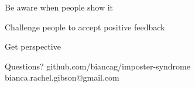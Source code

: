\documentclass[aspectratio=169]{beamer}
\begin{document}
\begin{frame}
  \begin{center}
    \Huge Be aware when people show it
    \small
  \end{center}
\end{frame}

\begin{frame}
  \begin{center}
    \Huge Challenge people to accept positive feedback
  \end{center}
\end{frame}

\begin{frame}
  \begin{center}
    \Huge Get perspective
    \small
  \end{center}
\end{frame}

\begin{frame}
  \begin{center}
    \Huge Questions?
    github.com/biancag/imposter-syndrome
    bianca.rachel.gibson@gmail.com
  \end{center}
\end{frame}

\begin{frame}
  

  
\end{frame}
\end{document}
